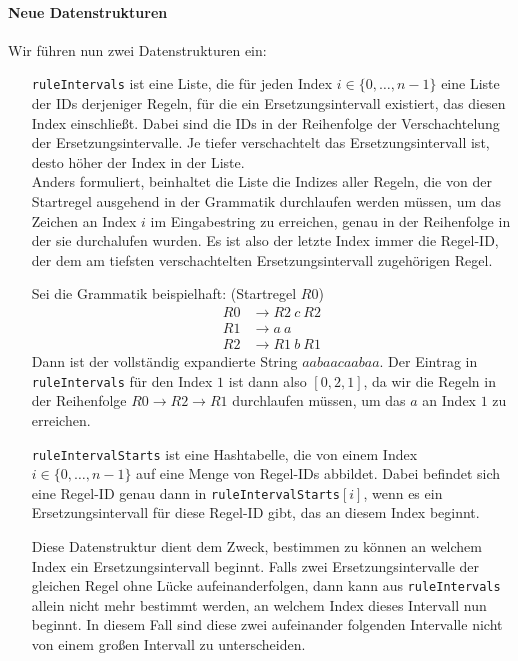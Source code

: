 \paragraph{Neue Datenstrukturen}
Wir führen nun zwei Datenstrukturen ein: 
\begin{itemize}[leftmargin=10em]
	\item[\texttt{ruleIntervals}] ist eine Liste, die für jeden Index $i \in \{0, \dots, n - 1\}$ eine Liste der IDs derjeniger Regeln, für die ein Ersetzungsintervall existiert, das diesen Index einschließt. Dabei sind die IDs in der Reihenfolge der Verschachtelung der Ersetzungsintervalle. Je tiefer verschachtelt das Ersetzungsintervall ist, desto höher der Index in der Liste.\\ 
	Anders formuliert, beinhaltet die Liste die Indizes aller Regeln, die von der Startregel ausgehend in der Grammatik durchlaufen werden müssen, um das Zeichen an Index $i$ im Eingabestring zu erreichen, genau in der Reihenfolge in der sie durchalufen wurden. Es ist also der letzte Index immer die Regel-ID, der dem am tiefsten verschachtelten Ersetzungsintervall zugehörigen Regel. 
	
	Sei die Grammatik beispielhaft: (Startregel $R0$)
	\begin{align*}
		R0 &\rightarrow R2\ c\ R2\\
		R1 &\rightarrow a\ a\\
		R2 &\rightarrow R1\ b\ R1
	\end{align*}
	Dann ist der vollständig expandierte String $aabaacaabaa$. Der Eintrag in \texttt{ruleIntervals} für den Index $1$ ist dann also $[0, 2, 1]$, da wir die Regeln in der Reihenfolge $R0 \rightarrow R2 \rightarrow R1$ durchlaufen müssen, um das $a$ an Index $1$ zu erreichen.
	
	\item[\texttt{ruleIntervalStarts}] ist eine Hashtabelle, die von einem Index $i \in \{0, \dots, n - 1\}$ auf eine Menge von Regel-IDs abbildet. Dabei befindet sich eine Regel-ID genau dann in \texttt{ruleIntervalStarts}$[i]$, wenn es ein Ersetzungsintervall für diese Regel-ID gibt, das an diesem Index beginnt.
	
	Diese Datenstruktur dient dem Zweck, bestimmen zu können an welchem Index ein Ersetzungsintervall beginnt. Falls zwei Ersetzungsintervalle der gleichen Regel ohne Lücke aufeinanderfolgen, dann kann aus \texttt{ruleIntervals} allein nicht mehr bestimmt werden, an welchem Index dieses Intervall nun beginnt. In diesem Fall sind diese zwei aufeinander folgenden Intervalle nicht von einem großen Intervall zu unterscheiden.
\end{itemize}

